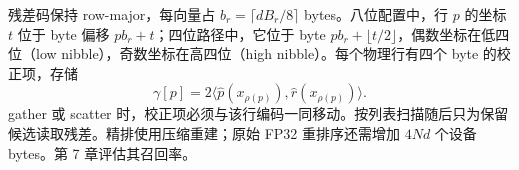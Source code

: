 残差码保持 row-major，每向量占 $b_r=\lceil dB_r/8\rceil$ bytes。八位配置中，行 $p$ 的坐标 $t$ 位于 byte 偏移 $pb_r+t$；四位路径中，它位于 byte $pb_r+\lfloor t/2\rfloor$，偶数坐标在低四位（low nibble），奇数坐标在高四位（high nibble）。每个物理行有四个 byte 的校正项，存储
\begin{equation}
 \gamma[ p ]=2\langle\widehat p(x_{\rho(p)}),
                              \widehat r(x_{\rho(p)})\rangle.
 \label{eq:4-correction}
\end{equation}
gather 或 scatter 时，校正项必须与该行编码一同移动。按列表扫描随后只为保留候选读取残差。精排使用压缩重建；原始 FP32 重排序还需增加 $4Nd$ 个设备 bytes。第 7 章评估其召回率。
